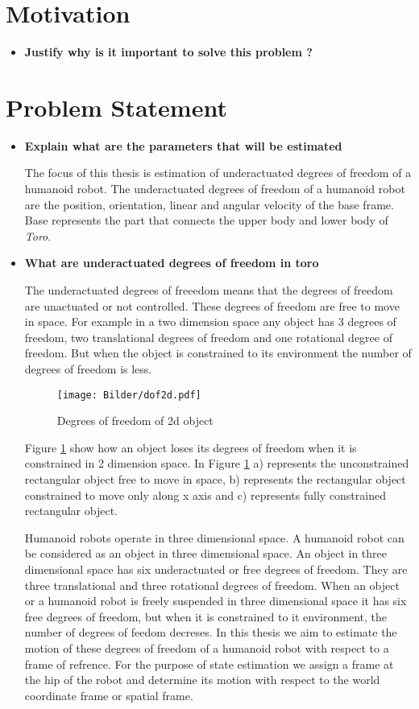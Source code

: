 \section{Motivation}
\begin{itemize}
\item \textbf{Justify why is it important to solve this problem ?}
\end{itemize}

\section{Problem Statement}
\begin{itemize}
    \item \textbf{Explain what are the parameters that will be estimated}

    The focus of this thesis is estimation of underactuated degrees of freedom of a humanoid robot. The underactuated degrees of freedom of a humanoid robot are the position, orientation, linear and angular velocity of the base frame. Base represents the part that connects the upper body and lower body of \emph{Toro}. 
    \item \textbf{What are underactuated degrees of freedom in toro}

    The underactuated degrees of freeedom means that the degrees of freedom are unactuated or not controlled. These degrees of freedom are free to move in space. For example in a two dimension space any object has 3 degrees of freedom, two translational degrees of freedom and one rotational degree of freedom. But when the object is constrained to its environment the number of degrees of freedom is less.
    \begin{figure}
    \begin{center}
    \texttt{[image: Bilder/dof2d.pdf]}
    \caption{ Degrees of freedom of 2d object}
    \label{fig:dof_2d}
    \end{center}
    \end{figure}
    Figure \ref{fig:dof_2d} show how an object loses its degrees of freedom when it is constrained in 2 dimension space. In Figure \ref{fig:dof_2d} a) represents the unconstrained rectangular object free to move in space, b) represents the rectangular object constrained to move only along x axis and c) represents fully constrained rectangular object. 
    
    Humanoid robots operate in three dimensional space. A humanoid robot can be considered as an object in three dimensional space. An object in three dimensional space has six underactuated or free degrees of freedom. They are three translational and three rotational degrees of freedom. When an object or a humanoid robot is freely suspended in three dimensional space it has six free degrees of freedom, but when it is constrained to it environment, the number of degrees of feedom decreses. In this thesis we aim to estimate the motion of these degrees of freedom of a humanoid robot with respect to a frame of refrence. For the purpose of state estimation we assign a frame at the hip of the robot and determine its motion with respect to the world coordinate frame or spatial frame.
    

\end{itemize}
